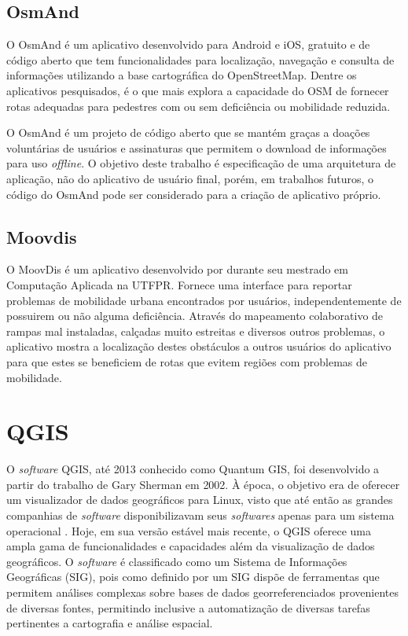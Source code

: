 \documentclass[oneside,openright,12pt]{ufsm_2015} %
\begin{document}
\subsection{OsmAnd}
O OsmAnd é um aplicativo desenvolvido para Android e iOS, gratuito e de código aberto que tem funcionalidades para localização, navegação e consulta de informações utilizando a base cartográfica do OpenStreetMap. 
Dentre os aplicativos pesquisados, é o que mais explora a capacidade do OSM de fornecer rotas adequadas para pedestres com ou sem deficiência ou mobilidade reduzida.

O OsmAnd é um projeto de código aberto que se mantém graças a doações voluntárias de usuários e assinaturas que permitem o download de informações para uso \textit{offline}. 
O objetivo deste trabalho é especificação de uma arquitetura de aplicação, não do aplicativo de usuário final, porém, em trabalhos futuros, o código do OsmAnd pode ser considerado para a criação de aplicativo próprio.

\subsection{Moovdis}
O MoovDis é um aplicativo desenvolvido por  durante seu mestrado em Computação Aplicada na UTFPR. 
Fornece uma interface para reportar problemas de mobilidade urbana encontrados por usuários, independentemente de possuirem ou não alguma deficiência. Através do mapeamento colaborativo de rampas mal instaladas, calçadas muito estreitas e diversos outros problemas, o aplicativo mostra a localização destes obstáculos a outros usuários do aplicativo para que estes se beneficiem de rotas que evitem regiões com problemas de mobilidade.

\section{QGIS}
O \textit{software} QGIS, até 2013 conhecido como Quantum GIS, foi desenvolvido a partir do trabalho de Gary Sherman em 2002. 
À época, o objetivo era de oferecer um visualizador de dados geográficos para Linux, visto que até então as grandes companhias de \textit{software} disponibilizavam seus \textit{softwares} apenas para um sistema operacional \cite{Hugentobler2008}.
Hoje, em sua versão estável mais recente, o QGIS oferece uma ampla gama de funcionalidades e capacidades além da visualização de dados geográficos. 
O \textit{software} é classificado como um  Sistema de Informações Geográficas (SIG), pois como definido por \cite{camara:sig} um SIG dispõe de ferramentas que permitem análises complexas sobre bases de dados georreferenciados provenientes de diversas fontes, permitindo inclusive a automatização de diversas tarefas pertinentes a cartografia e análise espacial.
\end{document}
